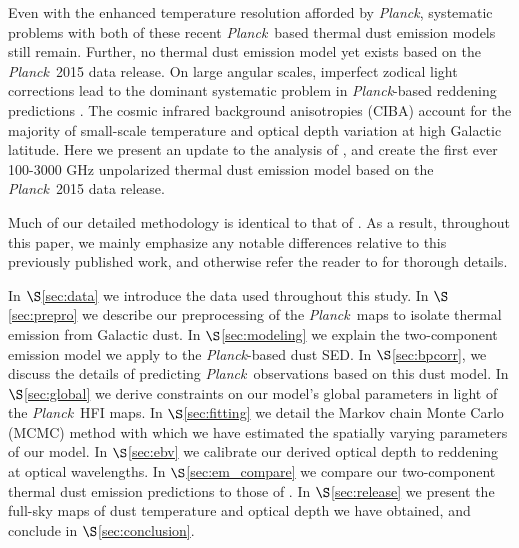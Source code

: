 \documentclass{emulateapj}
\newcommand{\PLANCK}{{\it Planck}}
\begin{document}

Even with the enhanced temperature resolution afforded by \PLANCK, 
systematic problems with both of these recent \PLANCK~based thermal dust 
emission models still remain. Further, no thermal dust emission model yet
exists based on the \PLANCK~2015 data release. On large angular scales, 
imperfect zodical light corrections lead to the dominant systematic problem
in \PLANCK-based reddening predictions \citep{meisner15}. The cosmic infrared 
background anisotropies (CIBA) account for the majority of small-scale 
temperature and optical depth variation at high Galactic latitude. Here we 
present an update to the analysis of \cite{meisner15}, and create the first 
ever 100-3000 GHz unpolarized thermal dust emission model based on the 
\PLANCK~2015 data release.

Much of our detailed methodology is identical to that of \cite{meisner15}. As a
result, throughout this paper, we mainly emphasize any notable differences 
relative to this previously published work, and otherwise refer the reader to 
\cite{meisner15} for thorough details.

In $\S$\ref{sec:data} we introduce the data used throughout this study. In
$\S$\ref{sec:prepro} we describe our preprocessing of the \PLANCK~maps to
isolate thermal emission from Galactic dust. In $\S$\ref{sec:modeling} we
explain the two-component emission model we apply to the \PLANCK-based dust
SED. In $\S$\ref{sec:bpcorr}, we discuss the details of predicting
\PLANCK~observations based on this dust model. In $\S$\ref{sec:global} we
derive constraints on our model's global parameters in light of the \PLANCK~HFI
maps. In $\S$\ref{sec:fitting} we detail the Markov chain Monte Carlo (MCMC)
method with which we have estimated the spatially varying parameters of our
model. In $\S$\ref{sec:ebv} we calibrate our derived optical depth to reddening
at optical wavelengths. In $\S$\ref{sec:em_compare} we compare our
two-component thermal dust emission predictions to those of \cite{planckdust}.
In $\S$\ref{sec:release} we present the full-sky maps of dust temperature and
optical depth we have obtained, and conclude in $\S$\ref{sec:conclusion}.
\end{document}

